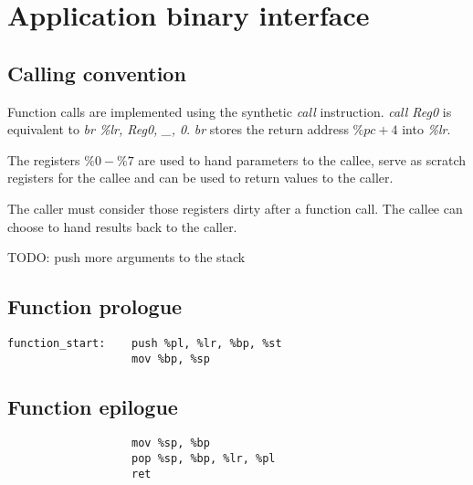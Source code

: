 \section{Application binary interface}

\subsection{Calling convention}

\newcommand{\I}[1]{\emph{#1}}

Function calls are implemented using the synthetic \I{call}
instruction. \I{call Reg0} is equivalent to \I{br \%lr, Reg0, \_,
  0}. \I{br} stores the return address \(\%pc + 4\) into \I{\%lr}.

The registers \(\%0 - \%7\) are used to hand parameters to the callee,
serve as scratch registers for the callee and can be used to return
values to the caller.

The caller must consider those registers dirty after a function call.
The callee can choose to hand results back to the caller.

TODO: push more arguments to the stack

\subsection{Function prologue}

\begin{lstlisting}
function_start:    push %pl, %lr, %bp, %st
                   mov %bp, %sp
\end{lstlisting}

\subsection{Function epilogue}

\begin{lstlisting}
                   mov %sp, %bp
                   pop %sp, %bp, %lr, %pl
                   ret
\end{lstlisting}
